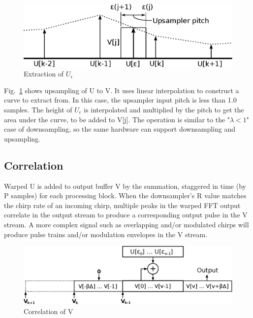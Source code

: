 \begin{figure}
	\centering
	\includegraphics[width=0.95\linewidth]{../source/uint_e}
	\caption[U interpolation]{Extraction of $U_\epsilon$}
	\label{fig:uint}
\end{figure}

Fig.~\ref{fig:uint} shows upsampling of U to V. It uses linear interpolation to
construct a curve to extract from.
In this case, the upsampler input pitch is less than 1.0 samples.
The height of $U_\epsilon$ is interpolated and multiplied by the pitch to get
the area under the curve, to be added to V[j].
The operation is similar to the "$\lambda < 1$" case of downsampling,
so the same hardware can support downsampling and upsampling.

\subsection{Correlation}

Warped U is added to output buffer V by the summation,
staggered in time (by P samples) for each processing block.
When the downsampler's R value matches the chirp rate of an incoming chirp,
multiple peaks in the warped FFT output correlate in the output stream to
produce a corresponding output pulse in the V stream.
A more complex signal such as overlapping and/or modulated chirps will produce
pulse trains and/or modulation envelopes in the V stream.

\begin{figure}
	\centering
	\includegraphics[width=0.99\linewidth]{../source/wbuf_e}
	\caption[W correlation]{Correlation of V}
	\label{fig:wbuf}
\end{figure}

